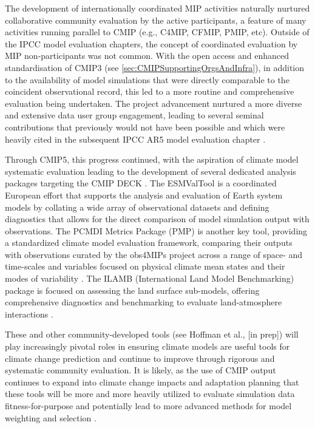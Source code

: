 \documentclass[gmd, preprint]{copernicus}
\begin{document}
The development of internationally coordinated MIP activities naturally nurtured collaborative community evaluation by the active participants, a feature of many activities running parallel to CMIP (e.g., C4MIP, CFMIP, PMIP, etc). Outside of the IPCC model evaluation chapters, the concept of coordinated evaluation by MIP non-participants was not common. With the open access and enhanced standardisation of CMIP3 (see \autoref{sec:CMIPSupportingOrgsAndInfra}), in addition to the availability of model simulations that were directly comparable to the coincident observational record, this led to a more routine and comprehensive evaluation being undertaken. The project advancement nurtured a more diverse and extensive data user group engagement, leading to several seminal contributions that previously would not have been possible \citep{gleckler_performance_2008,eyring_assessment_2006,waugh_quantitative_2008} and which were heavily cited in the subsequent IPCC AR5 model evaluation chapter \citep{flato_evaluation_2013}.

Through CMIP5, this progress continued, with the aspiration of climate model systematic evaluation leading to the development of several dedicated analysis packages targeting the CMIP DECK \citep{eyring_towards_2016}. The ESMValTool \citep[Earth System Model Evaluation Tool;][]{eyring_esmvaltool_2016,righi_earth_2020} is a coordinated European effort that supports the analysis and evaluation of Earth system models by collating a wide array of observational datasets and defining diagnostics that allows for the direct comparison of model simulation output with observations. The PCMDI Metrics Package (PMP) is another key tool, providing a standardized climate model evaluation framework, comparing their outputs with observations curated by the obs4MIPs project across a range of space- and time-scales and variables focused on physical climate mean states and their modes of variability \citep{gleckler_more_2016,lee_systematic_2024}. The ILAMB (International Land Model Benchmarking) package is focused on assessing the land surface sub-models, offering comprehensive diagnostics and benchmarking to evaluate land-atmosphere interactions \citep{collier_international_2018}.

These and other community-developed tools (see Hoffman et al., [in prep]) will play increasingly pivotal roles in ensuring climate models are useful tools for climate change prediction and continue to improve through rigorous and systematic community evaluation. It is likely, as the use of CMIP output continues to expand into climate change impacts and adaptation planning that these tools will be more and more heavily utilized to evaluate simulation data fitness-for-purpose and potentially lead to more advanced methods for model weighting and selection \citep{eyring_taking_2019}.
\end{document}
